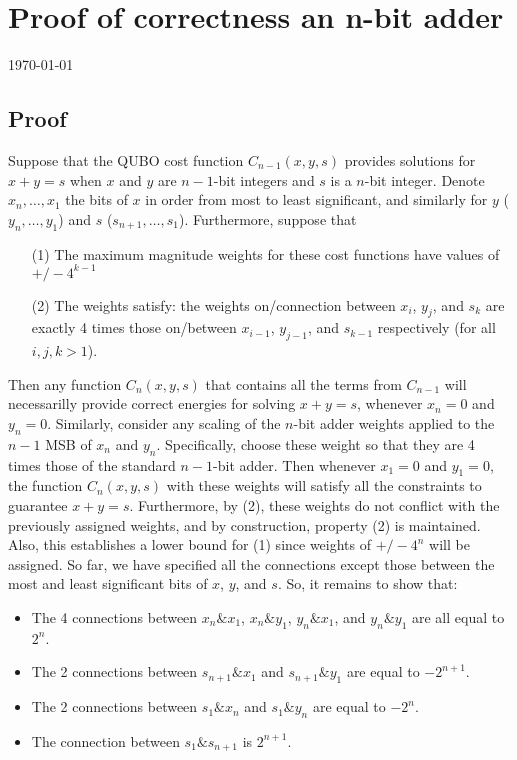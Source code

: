 \documentclass[12pt]{article}
\begin{document}
\section*{Proof of correctness an n-bit adder}
\today
\subsection*{Proof}
Suppose that the QUBO cost function $C_{n-1}(x,y,s)$ provides solutions for
$x+y=s$ when $x$ and $y$ are $n-1$-bit integers and $s$ is a $n$-bit
integer.
Denote $x_n, \ldots, x_1$ the bits of $x$ in order from most to least
significant, and similarly for $y$ ($y_n, \ldots, y_1$) and $s$ 
($s_{n+1}, \ldots, s_1$).
Furthermore, suppose that
\begin{enumerate}
\item[(1)] The maximum magnitude weights for these
cost functions have values of $+/- 4^{k-1}$
\item[(2)] The weights satisfy: the weights on/connection between
$x_i$, $y_j$, and $s_k$ are exactly 4 times those on/between
$x_{i-1}$, $y_{j-1}$, and $s_{k-1}$
respectively (for all $i,j,k > 1$).
\end{enumerate}
Then any function $C_n(x,y,s)$ that contains all the terms from
$C_{n-1}$ will necessarilly provide correct energies for solving $x+y=s$,
whenever $x_n = 0$ and $y_n = 0$.
Similarly, consider any scaling of the $n$-bit adder weights applied
to the $n-1$ MSB of $x_n$ and $y_n$. 
Specifically, choose these weight so that they are 4 times those of the
standard $n-1$-bit adder.
Then whenever $x_1=0$ and $y_1=0$, the function $C_n(x,y,s)$ with these
weights will satisfy all the constraints to guarantee $x+y=s$.
Furthermore, by (2), these weights do not conflict with the previously
assigned weights, and by construction, property (2) is maintained.
Also, this establishes a lower bound for (1) since weights of
$+/- 4^n$ will be assigned.
So far, we have specified all the connections except those between the
most and least significant bits of $x$, $y$, and $s$.
So, it remains to show that:
\begin{itemize}
\item The 4 connections between $x_n \& x_1$, $x_n \& y_1$, $y_n \& x_1$,
and $y_n \& y_1$ are all equal to $2^n$.
\item The 2 connections between $s_{n+1} \& x_1$ and $s_{n+1} \& y_1$ are
equal to $-2^{n+1}$.
\item The 2 connections between $s_1 \& x_n$ and $s_1 \& y_n$ are equal to
$-2^n$.
\item The connection between $s_1 \& s_{n+1}$ is $2^{n+1}$.
\end{itemize}
\end{document}
